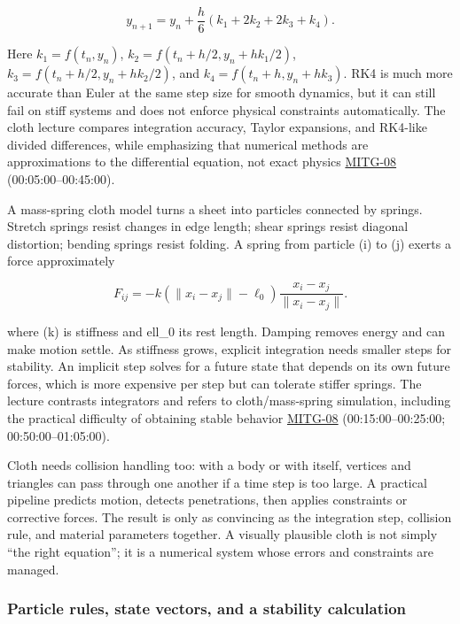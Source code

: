 \[
y_{n+1}=y_n+\frac{h}{6}(k_1+2k_2+2k_3+k_4).
\]

Here \(k_1=f(t_n,y_n)\), \(k_2=f(t_n+h/2,y_n+hk_1/2)\), \(k_3=f(t_n+h/2,y_n+hk_2/2)\), and \(k_4=f(t_n+h,y_n+hk_3)\). RK4 is much more accurate than Euler at the same step size for smooth dynamics, but it can still fail on stiff systems and does not enforce physical constraints automatically. The cloth lecture compares integration accuracy, Taylor expansions, and RK4-like divided differences, while emphasizing that numerical methods are approximations to the differential equation, not exact physics \hyperref[04-visual-computing-ii-ch036]{MITG-08} (00:05:00--00:45:00).

A mass-spring cloth model turns a sheet into particles connected by springs. Stretch springs resist changes in edge length; shear springs resist diagonal distortion; bending springs resist folding. A spring from particle (i) to (j) exerts a force approximately

\[
F_{ij}=-k(\|x_i-x_j\|-\ell_0)\frac{x_i-x_j}{\|x_i-x_j\|}.
\]

where (k) is stiffness and ell\_0 its rest length. Damping removes energy and can make motion settle. As stiffness grows, explicit integration needs smaller steps for stability. An implicit step solves for a future state that depends on its own future forces, which is more expensive per step but can tolerate stiffer springs. The lecture contrasts integrators and refers to cloth/mass-spring simulation, including the practical difficulty of obtaining stable behavior \hyperref[04-visual-computing-ii-ch036]{MITG-08} (00:15:00--00:25:00; 00:50:00--01:05:00).

Cloth needs collision handling too: with a body or with itself, vertices and triangles can pass through one another if a time step is too large. A practical pipeline predicts motion, detects penetrations, then applies constraints or corrective forces. The result is only as convincing as the integration step, collision rule, and material parameters together. A visually plausible cloth is not simply ``the right equation''; it is a numerical system whose errors and constraints are managed.

\subsubsection{Particle rules, state vectors, and a stability calculation}\label{particle-rules-state-vectors-and-a-stability-calculation}

